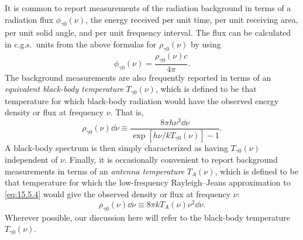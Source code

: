 It is common to report measurements of the radiation background in terms of a
radiation flux \(\phi_{\gamma0}(\nu)\), the energy received per unit time, per
unit receiving area, per unit solid angle, and per unit frequency interval. The
flux can be calculated in c.g.s.\ units from the above formulas for
\(\rho_{\gamma0}(\nu)\) by using
\[
  \phi_{\gamma0}(\nu)=\frac{\rho_{\gamma0}(\nu)c}{4\pi}.
\]
The background measurements are also frequently reported in terms of an
\emph{equivalent black-body temperature} \(T_{\gamma0}(\nu)\), which is
defined to be that temperature for which black-body radiation would have the
observed energy density or flux at frequency \(\nu\). That is,
\begin{equation}
  \rho_{\gamma0}(\nu)\dd\nu
  \equiv
  \frac{8\pi h\nu^3\dd\nu}
  {\exp[h\nu/kT_{\gamma0}(\nu)]-1}.
  \tag{15.5.6}\label{eq:15.5.6}
\end{equation}
A black-body spectrum is then simply characterized as having
\(T_{\gamma0}(\nu)\) independent of \(\nu\). Finally, it is occasionally
convenient to report background measurements in terms of an \emph{antenna
temperature} \(T_A(\nu)\), which is defined to be that temperature for which
the low-frequency Rayleigh--Jeans approximation to \eqref{eq:15.5.4} would
give the observed density or flux at frequency \(\nu\):
\begin{equation}
  \rho_{\gamma0}(\nu)\dd\nu
  \equiv
  8\pi kT_A(\nu)\nu^2\dd\nu.
  \tag{15.5.7}\label{eq:15.5.7}
\end{equation}
Wherever possible, our discussion here will refer to the black-body temperature
\(T_{\gamma0}(\nu)\).

